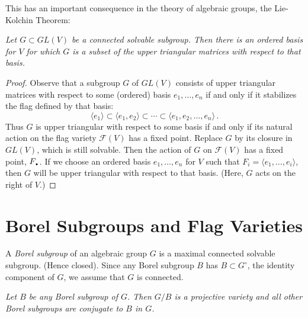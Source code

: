 \documentclass[12pt]{amsart}
\newcommand{\DOT}{{\mbox{\Large\bf .}}}
\begin{document}
This has an important consequence in the theory of algebraic groups, the 
Lie-Kolchin Theorem:
\medskip


{\it
Let $G\subset GL(V)$ be a connected solvable subgroup.
Then there is an ordered  basis for $V$ for which $G$ is a subset of the
upper triangular matrices with respect to that basis.
}\medskip

\begin{proof}
Observe that a subgroup $G$ of $GL(V)$ consists of upper triangular matrices
with respect to 
some (ordered) basis $e_1,\ldots,e_n$ if and only if it stabilizes the flag
defined by that basis:
$$
  \langle e_1 \rangle\subset
  \langle e_1,e_2 \rangle\subset\cdots\subset
  \langle e_1,e_2,\ldots,e_n \rangle\,.
$$
Thus $G$ is upper triangular with respect to some basis if and only if 
its natural action on the flag variety 
${\mathcal F}(V)$ has a fixed point.
Replace $G$ by its closure in $GL(V)$, which is still solvable.
Then the action of $G$ on ${\mathcal F}(V)$ has a fixed point, $F_{\DOT}$.
If we choose an ordered basis $e_1,\ldots,e_n$ for $V$ such that 
$F_i=\langle e_1,\ldots,e_i\rangle$, then $G$ will be upper triangular with
respect to that basis.
(Here, $G$ acts on the right of $V$.)
\end{proof}

\section{Borel Subgroups and Flag Varieties}

A {\sl Borel subgroup} of an algebraic group $G$ is a maximal connected
solvable subgroup.  (Hence closed).
Since any Borel subgroup $B$ has $B\subset G^{\circ}$, the identity
component of $G$, we assume that $G$ is connected.
\medskip

{\it
Let $B$ be any Borel subgroup of $G$.
Then $G/B$ is a projective variety and all other Borel subgroups are
conjugate to $B$ in $G$.}\medskip
\end{document}
